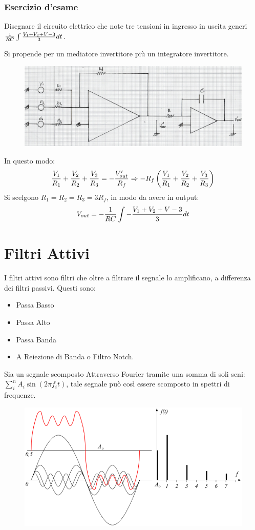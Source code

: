 \documentclass[a4paper, 15pt]{article}
\begin{document}
\subsubsection{Esercizio d'esame}
\begin{adjustwidth}{2in}{}
   		Disegnare il circuito elettrico che note tre tensioni in ingresso in uscita generi \({1\over RC}\int {V_1 + V_2 + V-3\over3}dt\). \newline 
   		
   		Si propende per un mediatore invertitore più un integratore invertitore.    		
   		\begin{figure}[H]
   			\centering
   			\includegraphics[width=0.5\linewidth]{immagini/mm(20)}
   			\label{fig:mm20}
   		\end{figure}   	
   		In questo modo:
   		\[{V_1\over R_1} + {V_2\over R_2} + {V_3\over R_3} = -{V'_{out}\over R_f} \Rightarrow -R_f\left({V_1\over R_1} + {V_2\over R_2} + {V_3\over R_3} \right)\]
   		Si scelgono $R_1=R_2=R_3 = 3R_f$, in modo da avere in output:
   		\[ V_{out} = -{1\over RC}\int -{V_1 + V_2 + V-3\over3}dt \]
\end{adjustwidth}
\newpage
\section{Filtri Attivi}
\begin{adjustwidth}{2in}{}
   		I filtri attivi sono filtri che oltre a filtrare il segnale lo amplificano, a differenza dei filtri passivi. Questi sono:
   		\begin{itemize}
   			\item Passa Basso 
   			\item Passa Alto
   			\item Passa Banda
   			\item A Reiezione di Banda o Filtro Notch. 
   		\end{itemize}
   		Sia un segnale scomposto Attraverso Fourier tramite una somma di soli seni: \(\sum_{i}^{n}A_i\sin(2\pi f_it)\), tale segnale può così essere scomposto in spettri di frequenze.
\begin{figure}[H]
	\centering
	\includegraphics[width=0.5\linewidth]{immagini/16}
	\label{fig:16}
\end{figure}
\end{adjustwidth}
\end{document}

